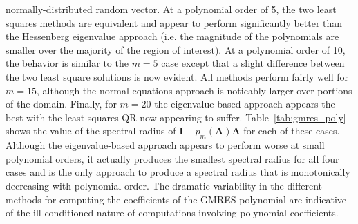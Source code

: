 \documentclass[10pt]{article}
\newcommand{\bA}{\ensuremath{\mathbf{A}}}
\newcommand{\bI}{\ensuremath{\mathbf{I}}}
\begin{document}
normally-distributed random vector.  At a polynomial order of 5,
the two least squares methods are equivalent and appear to perform
significantly better than the Hessenberg eigenvalue approach
(i.e. the magnitude of the polynomials are smaller over the majority
of the region of interest).  At a polynomial order of 10, the behavior
is similar to the $m=5$ case except that a slight difference between the
two least square solutions is now evident.  All methods perform fairly
well for $m=15$, although the normal equations approach is noticably
larger over portions of the domain.  Finally, for $m=20$ the
eigenvalue-based approach appears the best with the least squares QR
now appearing to suffer.  Table~\ref{tab:gmres_poly} shows the value
of the spectral radius of $\bI - p_m(\bA) \bA$ for each
of these cases.  Although the eigenvalue-based approach
appears to perform worse at small polynomial orders, it actually
produces the smallest spectral radius for all four cases and is the
only approach to produce a spectral radius that is monotonically decreasing
with polynomial order.
The dramatic variability in the different methods for computing the
coefficients of the GMRES polynomial are indicative of the ill-conditioned
nature of computations involving polynomial coefficients.
\end{document}
